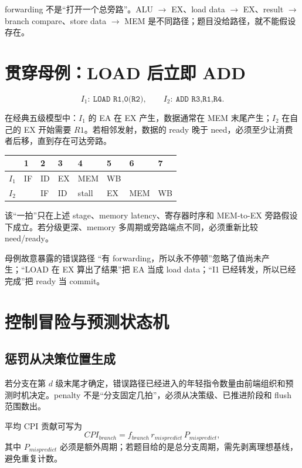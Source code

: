 \documentclass[UTF8,fontset=fandol,11pt,a4paper]{ctexart}
\newcommand{\code}[1]{\texttt{#1}}
\begin{document}
forwarding 不是“打开一个总旁路”。ALU $\to$ EX、load data $\to$ EX、result $\to$ branch compare、store data $\to$ MEM 是不同路径；题目没给路径，就不能假设存在。

\section{贯穿母例：LOAD 后立即 ADD}

\[
I_1:\ \code{LOAD R1,0(R2)},\qquad
I_2:\ \code{ADD R3,R1,R4}.
\]

在经典五级模型中：$I_1$ 的 EA 在 EX 产生，数据通常在 MEM 末尾产生；$I_2$ 在自己的 EX 开始需要 $R1$。若相邻发射，数据的 ready 晚于 need，必须至少让消费者后移，直到存在可达旁路。

\begin{center}
\small
\begin{tabularx}{\linewidth}{C{1.1cm}YYYYYYY}
\toprule
 & 1 & 2 & 3 & 4 & 5 & 6 & 7\\
\midrule
$I_1$ & IF & ID & EX & MEM & WB & &\\
$I_2$ & & IF & ID & stall & EX & MEM & WB\\
\bottomrule
\end{tabularx}
\end{center}

该“一拍”只在上述 stage、memory latency、寄存器时序和 MEM-to-EX 旁路假设下成立。若分级更深、memory 多周期或旁路端点不同，必须重新比较 need/ready。

\begin{warnbox}{母例故意暴露的错误路径}
“有 forwarding，所以永不停顿”忽略了值尚未产生；“LOAD 在 EX 算出了结果”把 EA 当成 load data；“I1 已经转发，所以已经完成”把 ready 当 commit。
\end{warnbox}

\section{控制冒险与预测状态机}

\subsection{惩罚从决策位置生成}
若分支在第 $d$ 级末尾才确定，错误路径已经进入的年轻指令数量由前端组织和预测时机决定。penalty 不是“分支固定几拍”，必须从决策级、已推进阶段和 flush 范围数出。

平均 CPI 贡献可写为
\[
CPI_{branch}=f_{branch}\,r_{mispredict}\,P_{mispredict},
\]
其中 $P_{mispredict}$ 必须是额外周期；若题目给的是总分支周期，需先剥离理想基线，避免重复计数。
\end{document}
